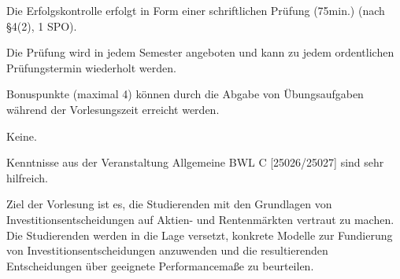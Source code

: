 \begin{course}

\setdoclanguagegerman
{}



\coursehead


\label{cour_6789.dp_997}


\begin{styleenv}
\begin{assessment}
Die Erfolgskontrolle erfolgt in Form einer schriftlichen Prüfung (75min.) (nach §4(2), 1 SPO).

 

Die Prüfung wird in jedem Semester angeboten und kann zu jedem ordentlichen Prüfungstermin wiederholt werden.

 

Bonuspunkte (maximal 4) können durch die Abgabe von Übungsaufgaben während der Vorlesungszeit erreicht werden.


\end{assessment}

\begin{conditions}Keine.\end{conditions}

\begin{recommendations}Kenntnisse aus der Veranstaltung Allgemeine BWL C [25026/25027] sind sehr hilfreich.

\end{recommendations}
\end{styleenv}

\begin{learningoutcomes}
Ziel der Vorlesung ist es, die Studierenden mit den Grundlagen von Investitionsentscheidungen auf Aktien- und Rentenmärkten vertraut zu machen. Die Studierenden werden in die Lage versetzt, konkrete Modelle zur Fundierung von Investitionsentscheidungen anzuwenden und die resultierenden Entscheidungen über geeignete Performancemaße zu beurteilen.



\end{learningoutcomes}
\end{course}
